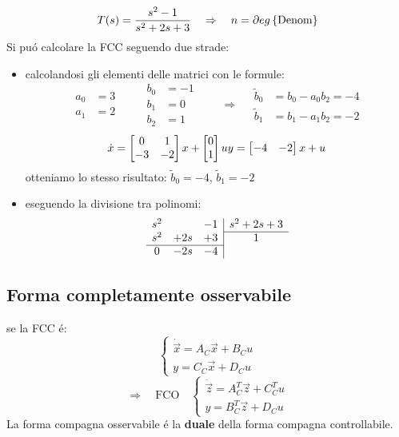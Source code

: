 \documentclass[../main.tex]{subfiles}
\begin{document}
		\begin{Exercise}[title={Calcolare la forma compagna controllabile}, difficulty=1]
			\[
				T(s) = \dfrac{s^2-1}{s^2+2s+3} \quad\Rightarrow\quad n = \partial eg \left\lbrace \text{Denom} \right\rbrace
			\]
			Si pu\'o calcolare la FCC seguendo due strade:
			\begin{itemize}
				\item 
					calcolandosi gli elementi delle matrici con le formule:
					\[
						\begin{aligned}
							a_0 &= 3\\
							a_1 &= 2
						\end{aligned}
						\qquad
						\begin{aligned}
							b_0 &= -1\\
							b_1 &= 0\\
							b_2 &= 1
						\end{aligned}
						\qquad\Rightarrow\quad
						\begin{aligned}
							\tilde b_0 &= b_0 - a_0 b_2 = -4\\
							\tilde b_1 &= b_1 - a_1 b_2 = -2
						\end{aligned}
					\]
					\[
						\dot x = 
						\begin{bmatrix}
							0 & 1\\
							-3 & -2
						\end{bmatrix} x+
						\begin{bmatrix}
							0\\
							1
						\end{bmatrix} u
						\\
						y =
						\begin{bmatrix}
							-4 & -2
						\end{bmatrix} x + u
					\]
					otteniamo lo stesso risultato: $ \tilde b_0 = -4 $, $ \tilde b_1 = -2 $
				\item 
					eseguendo la divisione tra polinomi:
					\[
						\begin{array}{ccc|c}
							s^2 & & -1 & s^2 + 2s + 3
							\\\cline{4-4}
							s^2 & +2s & +3 & 1
							\\\cline{1-3}
							0 & -2s & -4 &
						\end{array}
					\]
			\end{itemize} 
		\end{Exercise}
	
	\subsection{Forma completamente osservabile}
		se la FCC \'e:
		\[
			\begin{cases}
				\dot{\vec x} = A_C \vec x + B_C u\\
				y = C_C \vec x + D_C u
			\end{cases}
		\]
		\[
			\Rightarrow\quad\text{FCO}\quad
			\begin{cases}
				\dot{\vec z} = A_C^T \vec z + C_C^T u\\
				y = B_C^T \vec z + D_C u
			\end{cases}
		\]
		La forma compagna osservabile \'e la \textbf{duale} della forma compagna controllabile.
\end{document}
